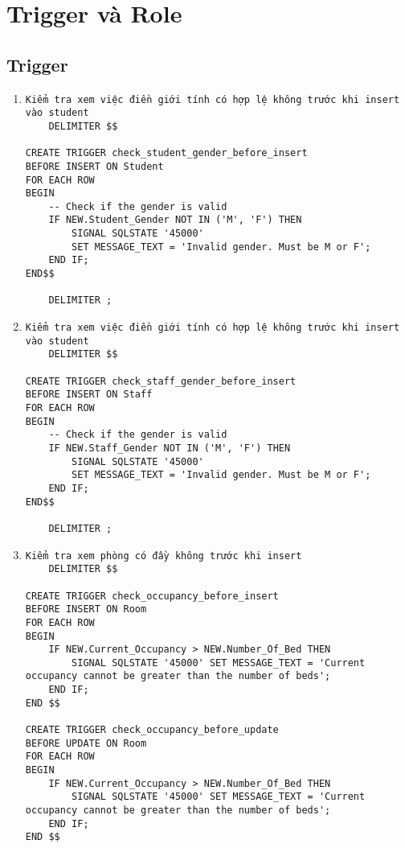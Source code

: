 \documentclass[a4paper,12pt]{article}
\begin{document}
\section{Trigger và Role}
\subsection{Trigger}
\begin{enumerate}
    \item \begin{verbatim}
Kiểm tra xem việc điền giới tính có hợp lệ không trước khi insert vào student
    DELIMITER $$

CREATE TRIGGER check_student_gender_before_insert
BEFORE INSERT ON Student
FOR EACH ROW
BEGIN
    -- Check if the gender is valid
    IF NEW.Student_Gender NOT IN ('M', 'F') THEN
        SIGNAL SQLSTATE '45000'
        SET MESSAGE_TEXT = 'Invalid gender. Must be M or F';
    END IF;
END$$

    DELIMITER ;
    \end{verbatim}
    \item \begin{verbatim}
Kiểm tra xem việc điền giới tính có hợp lệ không trước khi insert vào student
    DELIMITER $$

CREATE TRIGGER check_staff_gender_before_insert
BEFORE INSERT ON Staff
FOR EACH ROW
BEGIN
    -- Check if the gender is valid
    IF NEW.Staff_Gender NOT IN ('M', 'F') THEN
        SIGNAL SQLSTATE '45000'
        SET MESSAGE_TEXT = 'Invalid gender. Must be M or F';
    END IF;
END$$

    DELIMITER ;

    \end{verbatim}
    \item \begin{verbatim}
Kiểm tra xem phòng có đầy không trước khi insert
    DELIMITER $$

CREATE TRIGGER check_occupancy_before_insert
BEFORE INSERT ON Room
FOR EACH ROW
BEGIN
    IF NEW.Current_Occupancy > NEW.Number_Of_Bed THEN
        SIGNAL SQLSTATE '45000' SET MESSAGE_TEXT = 'Current occupancy cannot be greater than the number of beds';
    END IF;
END $$

CREATE TRIGGER check_occupancy_before_update
BEFORE UPDATE ON Room
FOR EACH ROW
BEGIN
    IF NEW.Current_Occupancy > NEW.Number_Of_Bed THEN
        SIGNAL SQLSTATE '45000' SET MESSAGE_TEXT = 'Current occupancy cannot be greater than the number of beds';
    END IF;
END $$


\end{verbatim}
\end{enumerate}
\end{document}
